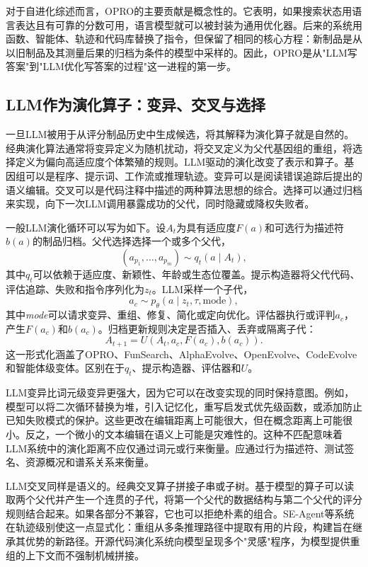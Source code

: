 对于自进化综述而言，OPRO的主要贡献是概念性的。它表明，如果搜索状态用语言表达且有可靠的分数可用，语言模型就可以被封装为通用优化器。后来的系统用函数、智能体、轨迹和代码库替换了指令，但保留了相同的核心方程：新制品是从以旧制品及其测量后果的归档为条件的模型中采样的。因此，OPRO是从"LLM写答案"到"LLM优化写答案的过程"这一进程的第一步。

\subsection{LLM作为演化算子：变异、交叉与选择}
\label{subsec:llm-evolutionary-operator}

一旦LLM被用于从评分制品历史中生成候选，将其解释为演化算子就是自然的。经典演化算法通常将变异定义为随机扰动，将交叉定义为父代基因组的重组，将选择定义为偏向高适应度个体繁殖的规则。LLM驱动的演化改变了表示和算子。基因组可以是程序、提示词、工作流或推理轨迹。变异可以是阅读错误追踪后提出的语义编辑。交叉可以是代码注释中描述的两种算法思想的综合。选择可以通过归档来实现，向下一次LLM调用暴露成功的父代，同时隐藏或降权失败者。

一般LLM演化循环可以写为如下。设$A_t$为具有适应度$F(a)$和可选行为描述符$b(a)$的制品归档。父代选择选择一个或多个父代，
\begin{equation}
  (a_{p_1},\ldots,a_{p_m})\sim q_t(a\mid A_t),
\end{equation}
其中$q_t$可以依赖于适应度、新颖性、年龄或生态位覆盖。提示构造器将父代代码、评估追踪、失败和指令序列化为$z_t$。LLM采样一个子代，
\begin{equation}
  a_{c}\sim p_\theta(a\mid z_t, \tau, \mathrm{mode}),
\end{equation}
其中\textit{mode}可以请求变异、重组、修复、简化或定向优化。评估器执行或评判$a_c$，产生$F(a_c)$和$b(a_c)$。归档更新规则决定是否插入、丢弃或隔离子代：
\begin{equation}
  A_{t+1}=U(A_t,a_c,F(a_c),b(a_c)).
\end{equation}
这一形式化涵盖了OPRO、FunSearch、AlphaEvolve、OpenEvolve、CodeEvolve和智能体级变体。区别在于$q_t$、提示构造器、评估器和$U$。

LLM变异比词元级变异更强大，因为它可以在改变实现的同时保持意图。例如，模型可以将二次循环替换为堆，引入记忆化，重写启发式优先级函数，或添加防止已知失败模式的保护。这些更改在编辑距离上可能很大，但在概念距离上可能很小。反之，一个微小的文本编辑在语义上可能是灾难性的。这种不匹配意味着LLM系统中的演化距离不应仅通过词元或行来衡量。应通过行为描述符、测试签名、资源概况和谱系关系来衡量。

LLM交叉同样是语义的。经典交叉算子拼接子串或子树。基于模型的算子可以读取两个父代并产生一个连贯的子代，将第一个父代的数据结构与第二个父代的评分规则结合起来。如果各部分不兼容，它也可以拒绝朴素的组合。SE-Agent等系统在轨迹级别使这一点显式化：重组从多条推理路径中提取有用的片段，构建旨在继承其优势的新路径。开源代码演化系统向模型呈现多个"灵感"程序，为模型提供重组的上下文而不强制机械拼接。

